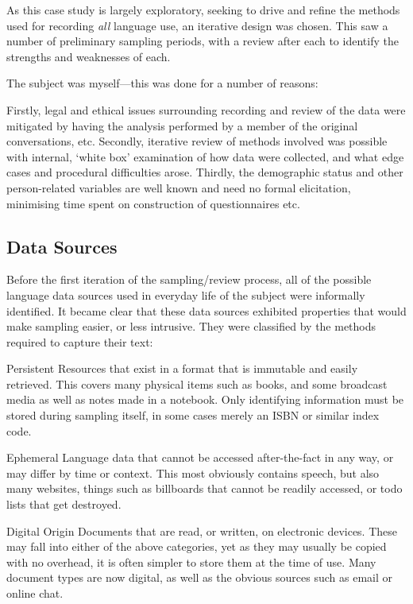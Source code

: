 As this case study is largely exploratory, seeking to drive and refine the methods used for recording \textsl{all} language use, an iterative design was chosen.  This saw a number of preliminary sampling periods, with a review after each to identify the strengths and weaknesses of each.

The subject was myself---this was done for a number of reasons:

Firstly, legal and ethical issues surrounding recording and review of the data were mitigated by having the analysis performed by a member of the original conversations, etc.
Secondly, iterative review of methods involved was possible with internal, `white box' examination of how data were collected, and what edge cases and procedural difficulties arose.
Thirdly, the demographic status and other person-related variables are well known and need no formal elicitation, minimising time spent on construction of questionnaires etc.


\subsection{Data Sources}
Before the first iteration of the sampling/review process, all of the possible language data sources used in everyday life of the subject were informally identified.  It became clear that these data sources exhibited properties that would make sampling easier, or less intrusive.  They were classified by the methods required to capture their text:

\begin{itemizeTitle}
    \item[Persistent] Resources that exist in a format that is immutable and easily retrieved.  This covers many physical items such as books, and some broadcast media as well as notes made in a notebook.  Only identifying information must be stored during sampling itself, in some cases merely an ISBN or similar index code.
    \item[Ephemeral] Language data that cannot be accessed after-the-fact in any way, or may differ by time or context.  This most obviously contains speech, but also many websites, things such as billboards that cannot be readily accessed, or todo lists that get destroyed.
    \item[Digital Origin] Documents that are read, or written, on electronic devices.  These may fall into either of the above categories, yet as they may usually be copied with no overhead, it is often simpler to store them at the time of use.  Many document types are now digital, as well as the obvious sources such as email or online chat.
\end{itemizeTitle}

